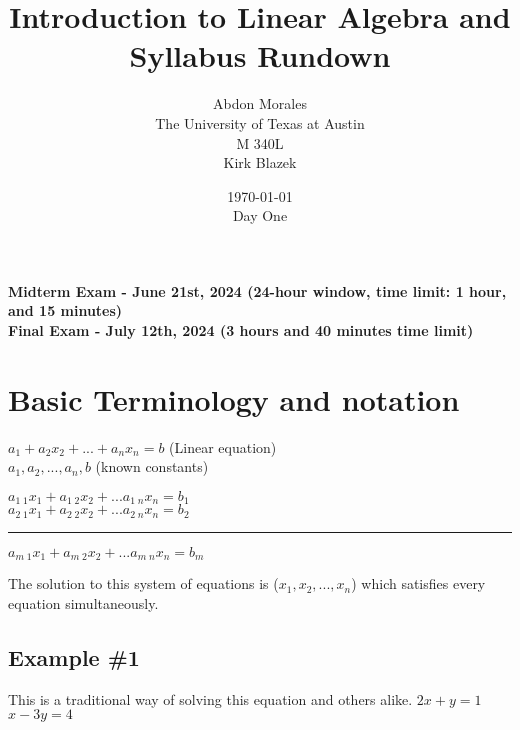 \documentclass[11pt]{article} %
\title{Introduction to Linear Algebra and Syllabus Rundown}
\author{Abdon Morales \\ The University of Texas at Austin \\ M 340L \\ Kirk Blazek}
\date{\today \\ Day One}
\begin{document}
\maketitle
\begin{tcolorbox}[width=\textwidth,colback={white},title={Important Dates for the course!!!},colbacktitle=yellow,coltitle=blue]
\begin{center}
\textbf{Midterm Exam - June 21st, 2024 (24-hour window, time limit: 1 hour, and 15 minutes)} \\
\textbf{Final Exam - July 12th, 2024 (3 hours and 40 minutes time limit)}
\end{center}
\end{tcolorbox}
\section*{Basic Terminology and notation}
$a_1 + a_2 x_2 + ... + a_n x_n = b$ (Linear equation) \\
$a_1, a_2, ..., a_n, b$ (known constants) \\
\begin{tcolorbox}[width=\textwidth,colback={white},title={System of linear equations},colbacktitle=yellow,coltitle=blue]
\begin{center}
$a_{1\;1} x_1 + a_{1\;2} x_2 + ... a_{1\;n} x_n = b_1$ \\
$a_{2\;1} x_1 + a_{2\;2} x_2 + ... a_{2\;n} x_n = b_2$ \\
\hrule
$a_{m\;1} x_1 + a_{m\;2} x_2 + ... a_{m\;n} x_n = b_m$
\end{center}
The solution to this system of equations is ($x_1, x_2, ..., x_n$) which satisfies every equation simultaneously.
\end{tcolorbox}

\subsection*{Example \#1}
This is a traditional way of solving this equation and others alike.
$2x + y = 1$ \\ $x - 3y = 4$
\end{document}

